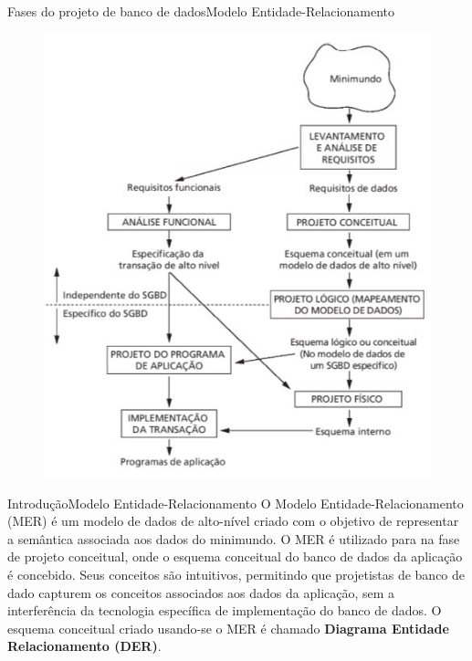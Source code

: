 \documentclass[t]{beamer}
\begin{document}


\begin{ftst}{Fases do projeto de banco de dados}{Modelo Entidade-Relacionamento}
\begin{figure}
    \centering
    \includegraphics[scale=0.5]{Figuras/01_1.jpg}
\end{figure}

\end{ftst}


\begin{ftst}{Introdução}{Modelo Entidade-Relacionamento}
\small
\vone
O Modelo Entidade-Relacionamento (MER) é um modelo de dados de alto-nível criado com o objetivo de representar a semântica associada aos dados do minimundo.
\vone
O MER é utilizado para na fase de projeto conceitual, onde o esquema conceitual do
banco de dados da aplicação é concebido.
\vone
Seus conceitos são intuitivos, permitindo que projetistas de banco de dado capturem os conceitos associados aos dados da aplicação, sem a interferência da tecnologia específica de implementação do banco de dados. 
\vone
O esquema conceitual criado usando-se o MER é chamado \textbf{Diagrama Entidade Relacionamento (DER)}.

\end{ftst}
\end{document}
